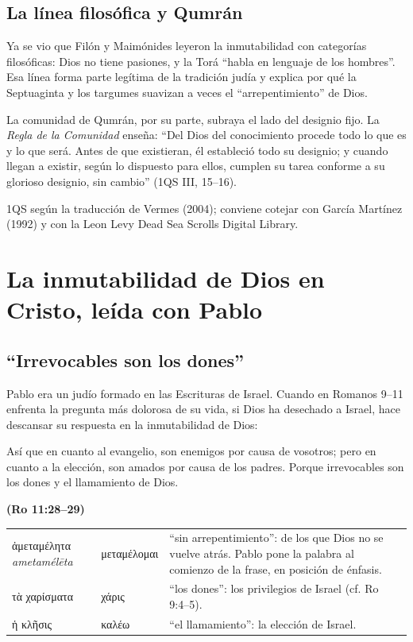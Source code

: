 \documentclass[11pt,letterpaper]{article}
\newcommand{\grc}[1]{\foreignlanguage{ancientgreek}{#1}}
\newcommand{\fuente}[1]{\par\hfill{\upshape\bfseries\small\textcolor{azul}{#1}}}
\begin{document}
\subsection{La línea filosófica y Qumrán}
Ya se vio que Filón y Maimónides leyeron la inmutabilidad con categorías filosóficas: Dios no tiene pasiones, y la Torá ``habla en lenguaje de los hombres''. Esa línea forma parte legítima de la tradición judía y explica por qué la Septuaginta y los targumes suavizan a veces el ``arrepentimiento'' de Dios.

La comunidad de Qumrán, por su parte, subraya el lado del designio fijo. La \emph{Regla de la Comunidad} enseña: ``Del Dios del conocimiento procede todo lo que es y lo que será. Antes de que existieran, él estableció todo su designio; y cuando llegan a existir, según lo dispuesto para ellos, cumplen su tarea conforme a su glorioso designio, sin cambio'' (1QS III, 15--16).

\begin{nota}[Precisión]
1QS según la traducción de Vermes (2004); conviene cotejar con García Martínez (1992) y con la Leon Levy Dead Sea Scrolls Digital Library.
\end{nota}

\section{La inmutabilidad de Dios en Cristo, leída con Pablo}

\subsection{``Irrevocables son los dones''}
Pablo era un judío formado en las Escrituras de Israel. Cuando en Romanos 9--11 enfrenta la pregunta más dolorosa de su vida, si Dios ha desechado a Israel, hace descansar su respuesta en la inmutabilidad de Dios:

\begin{cita}Así que en cuanto al evangelio, son enemigos por causa de vosotros; pero en cuanto a la elección, son amados por causa de los padres. Porque irrevocables son los dones y el llamamiento de Dios.\fuente{(Ro 11:28--29)}\end{cita}

\begin{filologia}[Ro 11:29]
\begin{tabular}{@{}L{3.2cm}L{1.6cm}L{10cm}@{}}
\grc{ἀμεταμέλητα} \emph{ametamélēta} & \grc{μεταμέλομαι} & ``sin arrepentimiento'': de los que Dios no se vuelve atrás. Pablo pone la palabra al comienzo de la frase, en posición de énfasis. \\[2pt]
\grc{τὰ χαρίσματα} & \grc{χάρις} & ``los dones'': los privilegios de Israel (cf. Ro 9:4--5). \\[2pt]
\grc{ἡ κλῆσις} & \grc{καλέω} & ``el llamamiento'': la elección de Israel. \\
\end{tabular}
\end{filologia}
\end{document}
